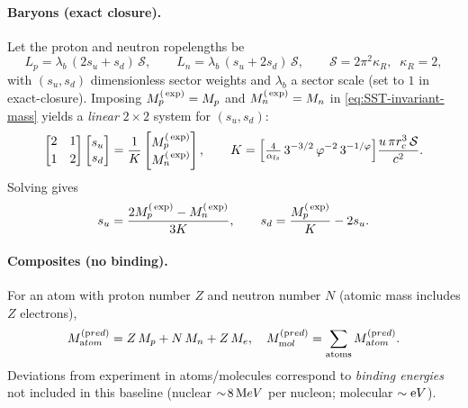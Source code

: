 \documentclass[10pt,reprint,aps,onecolumn,nofootinbib]{revtex4-2}
\begin{document}
    \paragraph{Baryons (exact closure).}
        Let the proton and neutron ropelengths be
        \[
            L_p=\lambda_b\,(2s_u+s_d)\,\mathcal S,\qquad
            L_n=\lambda_b\,(s_u+2s_d)\,\mathcal S,\qquad
            \mathcal S=2\pi^2\kappa_R,\;\;\kappa_R=2,
        \]
        with $(s_u,s_d)$ dimensionless sector weights and $\lambda_b$ a sector scale (set to $1$ in exact-closure).
        Imposing $M_p^{\textrm(\exp)}=M_p$ and $M_n^{\textrm(\exp)}=M_n$ in \eqref{eq:SST-invariant-mass} yields a \emph{linear} $2\times2$ system for $(s_u,s_d)$:
        \[
            \begin{bmatrix}
                2 & 1\\[2pt]
                1 & 2
            \end{bmatrix}
            \begin{bmatrix}
                s_u\\ s_d
            \end{bmatrix}

            =
            \frac{1}{K}
            \begin{bmatrix}
                M_p^{\textrm(\exp)}\\ M_n^{\textrm(\exp)}
            \end{bmatrix},
            \qquad
            K=\Big[\tfrac{4}{\alpha_{\textrm fs}}\,3^{-3/2}\,\varphi^{-2}\,3^{-1/\varphi}\Big]\frac{u\,\pi r_c^3\,\mathcal S}{c^2}.
        \]
        Solving gives
        \[
            s_u=\frac{2M_p^{\textrm(\exp)}-M_n^{\textrm(\exp)}}{3K},
            \qquad
            s_d=\frac{M_p^{\textrm(\exp)}}{K}-2s_u.
        \]

    \paragraph{Composites (no binding).}
        For an atom with proton number $Z$ and neutron number $N$ (atomic mass includes $Z$ electrons),
        \[
            M_{\textrm atom}^{(\textrm pred)} = Z\,M_p+N\,M_n+Z\,M_e,\quad
            M_{\textrm mol}^{(\textrm pred)}=\sum_{\text{atoms}}M_{\textrm atom}^{(\textrm pred)}.
        \]
        Deviations from experiment in atoms/molecules correspond to \emph{binding energies} not included in this baseline (nuclear $\sim\!8\,{\textrm MeV}$ per nucleon; molecular $\sim{\textrm eV}$).

\end{document}
